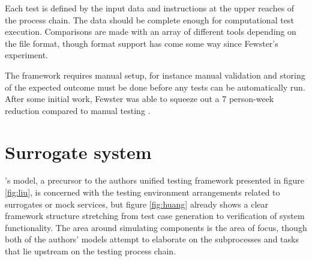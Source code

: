 \documentclass[12pt,a4paper,oneside,pdftex]{report}
\begin{document}
Each test is defined by the input data and instructions at the upper reaches of the process chain. The data should be complete enough for computational test execution. Comparisons are made with an array of different tools depending on the file format, though format support has come some way since Fewster's experiment.

The framework requires manual setup, for instance manual validation and storing of the expected outcome must be done before any tests can be automatically run. After some initial work, Fewster was able to squeeze out a 7 person-week reduction compared to manual testing \citep{fewster1999software}.

\section{Surrogate system}

\citeauthor{huang2008surrogate}'s \citeyearpar{huang2008surrogate} model, a precursor to the authors unified testing framework presented in figure \ref{fig:liu}, is concerned with the testing environment arrangements related to surrogates or mock services, but figure \ref{fig:huang} already shows a clear framework structure stretching from test case generation to verification of system functionality. The area around simulating components is the area of focus, though both of the authors' models attempt to elaborate on the subprocesses and tasks that lie upstream on the testing process chain. \citep{huang2008surrogate}
\end{document}

